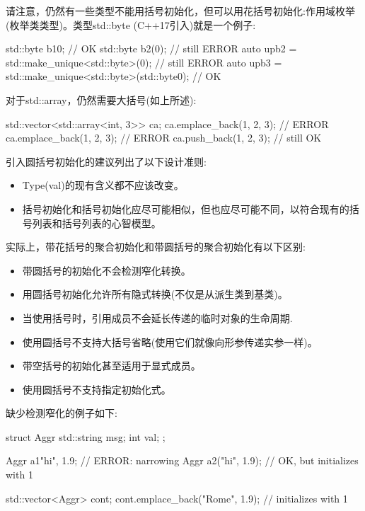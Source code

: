 请注意，仍然有一些类型不能用括号初始化，但可以用花括号初始化:作用域枚举(枚举类类型)。类型std::byte (C++17引入)就是一个例子:

\begin{cpp}
std::byte b1{0}; // OK
std::byte b2(0); // still ERROR
auto upb2 = std::make_unique<std::byte>(0); // still ERROR
auto upb3 = std::make_unique<std::byte>(std::byte{0}); // OK
\end{cpp}

对于std::array，仍然需要大括号(如上所述):

\begin{cpp}
std::vector<std::array<int, 3>> ca;
ca.emplace_back(1, 2, 3); // ERROR
ca.emplace_back({1, 2, 3}); // ERROR
ca.push_back({1, 2, 3}); // still OK
\end{cpp}


引入圆括号初始化的建议列出了以下设计准则:

\begin{itemize}
\item 
Type(val)的现有含义都不应该改变。

\item 
括号初始化和括号初始化应尽可能相似，但也应尽可能不同，以符合现有的括号列表和括号列表的心智模型。
\end{itemize}

实际上，带花括号的聚合初始化和带圆括号的聚合初始化有以下区别:

\begin{itemize}
\item 
带圆括号的初始化不会检测窄化转换。

\item 
用圆括号初始化允许所有隐式转换(不仅是从派生类到基类)。

\item
当使用括号时，引用成员不会延长传递的临时对象的生命周期.

\item
使用圆括号不支持大括号省略(使用它们就像向形参传递实参一样)。

\item
带空括号的初始化甚至适用于显式成员。

\item
使用圆括号不支持指定初始化式。
\end{itemize}

缺少检测窄化的例子如下:

\begin{cpp}
struct Aggr {
	std::string msg;
	int val;
};

Aggr a1{"hi", 1.9}; // ERROR: narrowing
Aggr a2("hi", 1.9); // OK, but initializes with 1

std::vector<Aggr> cont;
cont.emplace_back("Rome", 1.9); // initializes with 1
\end{cpp}


